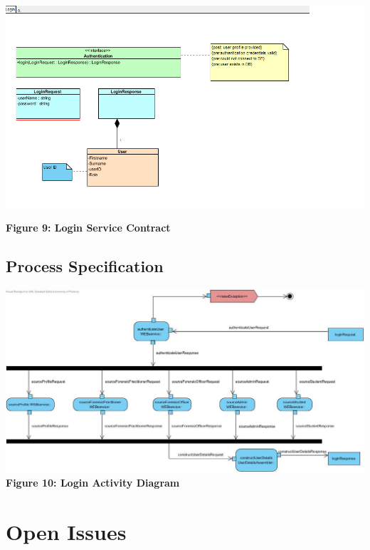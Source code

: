 \documentclass[10pt,a4paper]{article}
\begin{document}
   \begin{center}
   	\includegraphics[scale=0.4]{LoginServiceContract.png}
   	
   	\textbf{Figure 9: Login Service Contract}
   \end{center}
\subsection{Process Specification}
\begin{center}
	\includegraphics[scale=0.4]{loginActivity.jpg}
	\textbf{Figure 10: Login Activity Diagram}
\end{center}
\pagebreak

\section{Open Issues}
\end{document}
